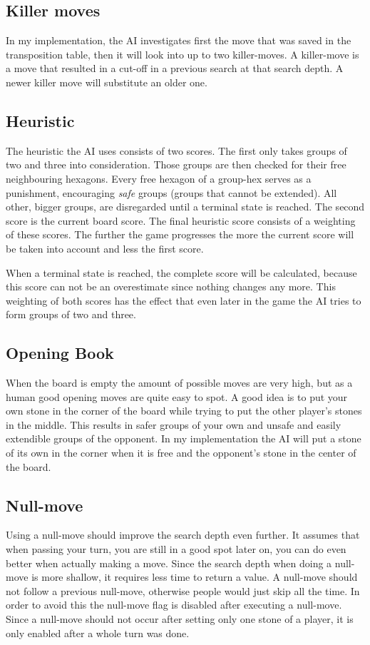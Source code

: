 \documentclass[a4paper]{article}
\begin{document}
\subsection{Killer moves}
In my implementation, the AI investigates first the move that was saved in the transposition table, then it will look into up to two killer-moves. A killer-move is a move that resulted in a cut-off in a previous search at that search depth. A newer killer move will substitute an older one.

\subsection{Heuristic}
The heuristic the AI uses consists of two scores. The first only takes groups of two and three into consideration. Those groups are then checked for their free neighbouring hexagons. Every free hexagon of a group-hex serves as a punishment, encouraging \textit{safe} groups (groups that cannot be extended). All other, bigger groups, are disregarded until a terminal state is reached. The second score is the current board score. The final heuristic score consists of a weighting of these scores. The further the game progresses the more the current score will be taken into account and less the first score.

When a terminal state is reached, the complete score will be calculated, because this score can not be an overestimate since nothing changes any more. This weighting of both scores has the effect that even later in the game the AI tries to form groups of two and three.

\subsection{Opening Book}
When the board is empty the amount of possible moves are very high, but as a human good opening moves are quite easy to spot. A good idea is to put your own stone in the corner of the board while trying to put the other player's stones in the middle. This results in safer groups of your own and unsafe and easily extendible groups of the opponent.
In my implementation the AI will put a stone of its own in the corner when it is free and the opponent's stone in the center of the board.

\subsection{Null-move}
Using a null-move should improve the search depth even further. It assumes that when passing your turn, you are still in a good spot later on, you can do even better when actually making a move. Since the search depth when doing a null-move is more shallow, it requires less time to return a value. A null-move should not follow a previous null-move, otherwise people would just skip all the time. In order to avoid this the null-move flag is disabled after executing a null-move. Since a null-move should not occur after setting only one stone of a player, it is only enabled after a whole turn was done.
\end{document}
